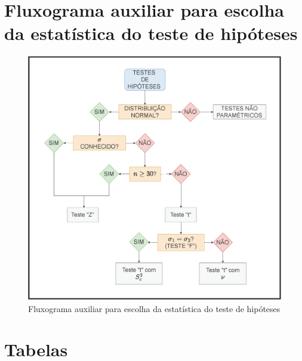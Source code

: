 \documentclass[
]{book}
\begin{document}
\hfill\break

\hypertarget{fluxograma-auxiliar-para-escolha-da-estatuxedstica-do-teste-de-hipuxf3teses}{%
\section{Fluxograma auxiliar para escolha da estatística do teste de hipóteses}\label{fluxograma-auxiliar-para-escolha-da-estatuxedstica-do-teste-de-hipuxf3teses}}

\begin{figure}

{\centering \includegraphics[width=0.8\linewidth]{images11/esquema_teste_hipoteses} 

}

\caption{Fluxograma auxiliar para escolha da estatística do teste de hipóteses}\label{fig:unnamed-chunk-138}
\end{figure}

\hfill\break

\hypertarget{tabelas-1}{%
\section{Tabelas}\label{tabelas-1}}
\end{document}
